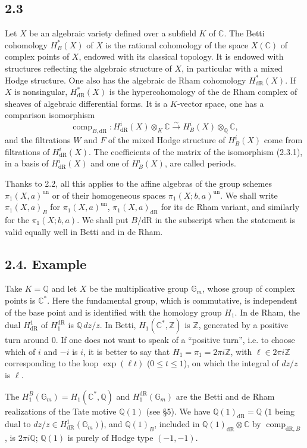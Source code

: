 \documentclass[11pt]{article}
\newcommand{\Q}{\mathbb Q}
\newcommand{\Z}{\mathbb Z}
\newcommand{\C}{\mathbb C}
\newcommand{\Gm}{\mathbb G_m}
\newcommand{\comp}{\operatorname{comp}}
\newcommand{\dR}{\mathrm{dR}}
\begin{document}
\subsection*{2.3}
Let $X$ be an algebraic variety defined over a subfield $K$ of $\C$.
The Betti cohomology $H^*_B(X)$ of $X$ is the rational cohomology of the space $X(\C)$ of complex points of $X$, endowed with its classical topology.
It is endowed with structures reflecting the algebraic structure of $X$, in particular with a mixed Hodge structure.
One also has the algebraic de Rham cohomology $H^*_{\dR}(X)$.
If $X$ is nonsingular, $H^*_{\dR}(X)$ is the hypercohomology of the de Rham complex of sheaves of algebraic differential forms.
It is a $K$-vector space, one has a comparison isomorphism
\begin{equation}
\comp_{B,\dR}:H^i_{\dR}(X)\otimes_K\C\xrightarrow{\sim}H^i_B(X)\otimes_\Q\C,
\tag{2.3.1}
\end{equation}
and the filtrations $W$ and $F$ of the mixed Hodge structure of $H^i_B(X)$ come from filtrations of $H^i_{\dR}(X)$.
The coefficients of the matrix of the isomorphism (2.3.1), in a basis of $H^i_{\dR}(X)$ and one of $H^i_B(X)$, are called periods.

Thanks to 2.2, all this applies to the affine algebras of the group schemes $\pi_1(X,a)^{\mathrm{un}}$ or of their homogeneous spaces $\pi_1(X;b,a)^{\mathrm{un}}$.
We shall write $\pi_1(X,a)_B$ for $\pi_1(X,a)^{\mathrm{un}}$, $\pi_1(X,a)_{\dR}$ for its de Rham variant, and similarly for the $\pi_1(X;b,a)$.
We shall put $B/\dR$ in the subscript when the statement is valid equally well in Betti and in de Rham.

\subsection*{2.4. Example}
Take $K=\Q$ and let $X$ be the multiplicative group $\Gm$, whose group of complex points is $\C^*$.
Here the fundamental group, which is commutative, is independent of the base point and is identified with the homology group $H_1$.
In de Rham, the dual $H^1_{\dR}$ of $H^{\dR}_1$ is $\Q\,dz/z$.
In Betti, $H_1(\C^*,\Z)$ is $\Z$, generated by a positive turn around $0$.
If one does not want to speak of a ``positive turn'', i.e. to choose which of $i$ and $-i$ is $i$, it is better to say that $H_1=\pi_1=2\pi i\Z$, with $\ell\in2\pi i\Z$ corresponding to the loop $\exp(\ell t)$ ($0\leq t\leq1$), on which the integral of $dz/z$ is $\ell$.

The $H^B_1(\Gm)=H_1(\C^*,\Q)$ and $H^{\dR}_1(\Gm)$ are the Betti and de Rham realizations of the Tate motive $\Q(1)$ (see \S5).
We have $\Q(1)_{\dR}=\Q$ ($1$ being dual to $dz/z\in H^1_{\dR}(\Gm)$), and $\Q(1)_B$, included in $\Q(1)_{\dR}\otimes\C$ by $\comp_{\dR,B}$, is $2\pi i\Q$; $\Q(1)$ is purely of Hodge type $(-1,-1)$.
\end{document}

